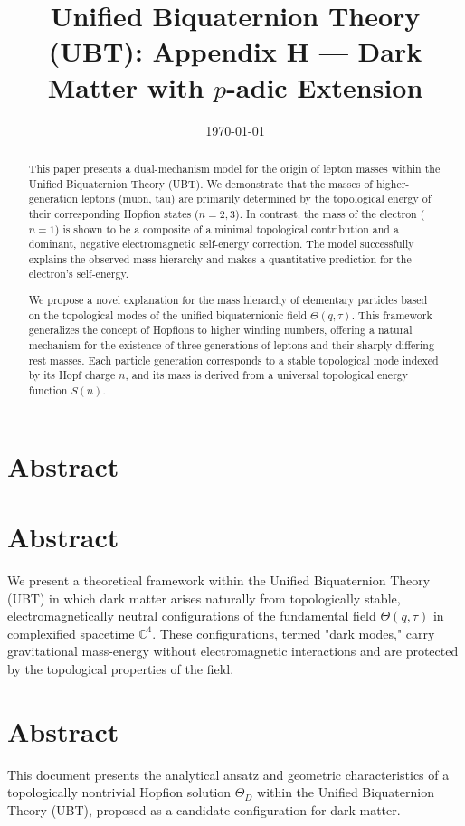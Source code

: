 \documentclass[12pt,a4paper]{article}
\title{Unified Biquaternion Theory (UBT): Appendix H --- Dark Matter with $p$-adic Extension}
\author{}
\date{\today}
\numberwithin{equation}{section}
\theoremstyle{definition}
\theoremstyle{remark}
\begin{document}
\maketitle

\section{Abstract}
\section*{Abstract}
We present a theoretical framework within the Unified Biquaternion Theory (UBT) in which dark matter arises naturally from topologically stable, electromagnetically neutral configurations of the fundamental field \( \Theta(q, \tau) \) in complexified spacetime \( \mathbb{C}^4 \). These configurations, termed "dark modes," carry gravitational mass-energy without electromagnetic interactions and are protected by the topological properties of the field.

\section*{Abstract}
This document presents the analytical ansatz and geometric characteristics of a topologically nontrivial Hopfion solution \(\Theta_D\) within the Unified Biquaternion Theory (UBT), proposed as a candidate configuration for dark matter.

\begin{abstract}
This paper presents a dual-mechanism model for the origin of lepton masses within the Unified Biquaternion Theory (UBT). We demonstrate that the masses of higher-generation leptons (muon, tau) are primarily determined by the topological energy of their corresponding Hopfion states (\(n=2, 3\)). In contrast, the mass of the electron (\(n=1\)) is shown to be a composite of a minimal topological contribution and a dominant, negative electromagnetic self-energy correction. The model successfully explains the observed mass hierarchy and makes a quantitative prediction for the electron's self-energy.
\end{abstract}

\begin{abstract}
We propose a novel explanation for the mass hierarchy of elementary particles based on the topological modes of the unified biquaternionic field $\Theta(q, \tau)$. This framework generalizes the concept of Hopfions to higher winding numbers, offering a natural mechanism for the existence of three generations of leptons and their sharply differing rest masses. Each particle generation corresponds to a stable topological mode indexed by its Hopf charge $n$, and its mass is derived from a universal topological energy function $S(n)$.
\end{abstract}
\end{document}
